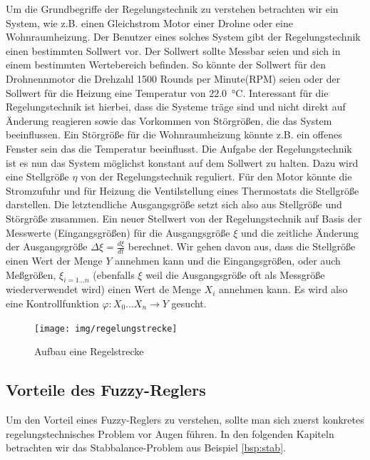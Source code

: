 \documentclass[12pt,a4paper,bibliography=totocnumbered,listof=totocnumbered, abstracton]{scrartcl}
\theoremstyle{Umgebung}
\begin{document}
Um die Grundbegriffe der Regelungstechnik zu verstehen betrachten wir ein System, wie z.B. einen Gleichstrom Motor einer Drohne oder eine Wohnraumheizung. Der Benutzer eines solches System gibt der Regelungstechnik einen bestimmten Sollwert vor. Der Sollwert sollte Messbar seien und sich in einem bestimmten Wertebereich befinden. So könnte der Sollwert für den Drohnennmotor die Drehzahl 1500 Rounds per Minute(RPM) seien oder der Sollwert für die Heizung eine Temperatur von \SI{22.0}{\celsius}. Interessant für die Regelungstechnik ist hierbei, dass die Systeme träge sind und nicht direkt auf Änderung reagieren sowie das Vorkommen von Störgrößen, die das System beeinflussen. Ein Störgröße für die Wohnraumheizung könnte z.B. ein offenes Fenster sein das die Temperatur beeinflusst. Die Aufgabe der Regelungstechnik ist es nun das System möglichst konstant auf dem Sollwert zu halten. Dazu wird eine Stellgröße $\eta$ von der Regelungstechnik reguliert. Für den Motor könnte die Stromzufuhr und für Heizung die Ventilstellung eines Thermostats die Stellgröße darstellen. Die letztendliche Ausgangsgröße setzt sich also aus Stellgröße und Störgröße zusammen. Ein neuer Stellwert von der Regelungstechnik auf Basis der Messwerte (Eingangsgrößen) für die Ausgangsgröße $\xi$ und die zeitliche Änderung der Ausgangsgröße $\Delta\xi = \frac{d\xi}{dt}$ berechnet. Wir gehen davon aus, dass die Stellgröße einen Wert der Menge $Y$ annehmen kann und die Eingangsgrößen, oder auch Meßgrößen, $\xi_{i=1...n}$ (ebenfalls $\xi$ weil die Ausgangsgröße oft als Messgröße wiederverwendet wird) einen Wert de Menge $X_i$ annehmen kann. Es wird also eine Kontrollfunktion $\varphi: X_0...X_n \rightarrow Y$ gesucht.

\begin{figure}
	\centering
	\texttt{[image: img/regelungstrecke]}
	\caption[Aufbau einer Regelstrecke]{Aufbau eine Regelstrecke}
	\label{fig:regelungstrecke}
\end{figure}


\subsection{Vorteile des Fuzzy-Reglers}

Um den Vorteil eines Fuzzy-Reglers zu verstehen, sollte man sich zuerst konkretes regelungstechnisches Problem vor Augen führen. In den folgenden Kapiteln betrachten wir das Stabbalance-Problem aus Beispiel \ref{bsp:stab}. 
\end{document}
